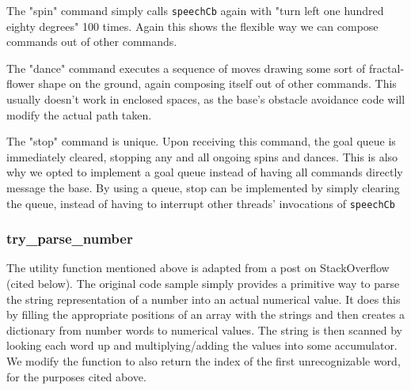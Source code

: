 \documentclass{article}
\begin{document}
\noindent The "spin" command simply calls \texttt{speechCb} again with "turn left one hundred eighty degrees" 100 times. Again this shows the flexible way we can compose commands out of other commands.\par

\vspace{5mm}

\noindent The "dance" command executes a sequence of moves drawing some sort of fractal-flower shape on the ground, again composing itself out of other commands. This usually doesn't work in enclosed spaces, as the base's obstacle avoidance code will modify the actual path taken.

\vspace{5mm}

\noindent The "stop" command is unique. Upon receiving this command, the goal queue is immediately cleared, stopping any and all ongoing spins and dances. This is also why we opted to implement a goal queue instead of having all commands directly message the base. By using a queue, stop can be implemented by simply clearing the queue, instead of having to interrupt other threads' invocations of \texttt{speechCb}

\subsubsection{try\_parse\_number}
The utility function mentioned above is adapted from a post on StackOverflow (cited below). The original code sample simply provides a primitive way to parse the string representation of a number into an actual numerical value. It does this by filling the appropriate positions of an array with the strings and then creates a dictionary from number words to numerical values. The string is then scanned by looking each word up and multiplying/adding the values into some accumulator. We modify the function to also return the index of the first unrecognizable word, for the purposes cited above.
\end{document}
